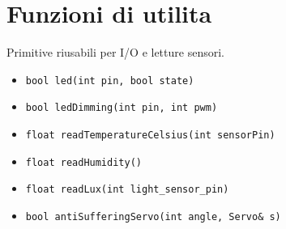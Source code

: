 \section{Funzioni di utilita}
Primitive riusabili per I/O e letture sensori.
\begin{itemize}
  \item \texttt{bool led(int pin, bool state)}
  \item \texttt{bool ledDimming(int pin, int pwm)}
  \item \texttt{float readTemperatureCelsius(int sensorPin)}
  \item \texttt{float readHumidity()}
  \item \texttt{float readLux(int light\_sensor\_pin)}
  \item \texttt{bool antiSufferingServo(int angle, Servo\& s)}
\end{itemize}
